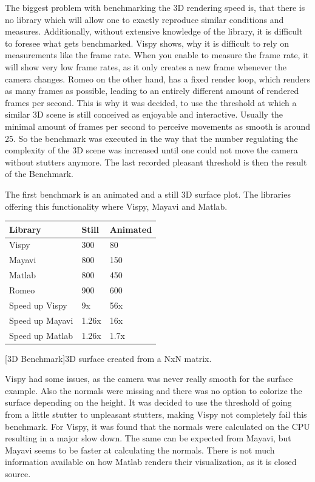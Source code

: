 The biggest problem with benchmarking the 3D rendering speed is, that there is no library which will allow one to exactly reproduce similar conditions and measures. 
Additionally, without extensive knowledge of the library, it is difficult to foresee what gets benchmarked. 
Vispy shows, why it is difficult to rely on measurements like the frame rate. When you enable to measure the frame rate, it will show very low frame rates, as it only creates a new frame whenever the camera changes.
Romeo on the other hand, has a fixed render loop, which renders as many frames as possible, leading to an entirely different amount of rendered frames per second. 
This is why it was decided, to use the threshold at which a similar 3D scene is still conceived as enjoyable and interactive. Usually the minimal amount of frames per second to perceive movements as smooth is around 25.
So the benchmark was executed in the way that the number regulating the complexity of the 3D scene was increased until one could not move the camera without stutters anymore. The last recorded pleasant threshold is then the result of the Benchmark.

The first benchmark is an animated and a still 3D surface plot. The libraries offering this functionality where Vispy, Mayavi and Matlab.

\begin{table}[htbp]
    \centering
    \begin{tabular}{l|l|l}
        \hline
        \textbf{Library} & \textbf{Still} & \textbf{Animated} \\
        \hline
        Vispy            & 300            & 80    \\
        Mayavi           & 800            & 150   \\
        Matlab           & 800            & 450   \\
        Romeo            & 900            & 600   \\
        \hline
        \hline
        Speed up Vispy   & 9x            & 56x   \\
        Speed up Mayavi  & 1.26x         & 16x   \\
        Speed up Matlab  & 1.26x         & 1.7x  \\
    \end{tabular}
    [3D Benchmark]{3D surface created from a NxN matrix.}
    \label{table:relativespeedoglw}
\end{table}
Vispy had some issues, as the camera was never really smooth for the surface example. Also the normals were missing and there was no option to colorize the surface depending on the height.
It was decided to use the threshold of going from a little stutter to unpleasant stutters, making Vispy not completely fail this benchmark.
For Vispy, it was found that the normals were calculated on the CPU resulting in a major slow down\cite{VispyGithub}. The same can be expected from Mayavi, but Mayavi seems to be faster at calculating the normals.
There is not much information available on how Matlab renders their visualization, as it is closed source.

